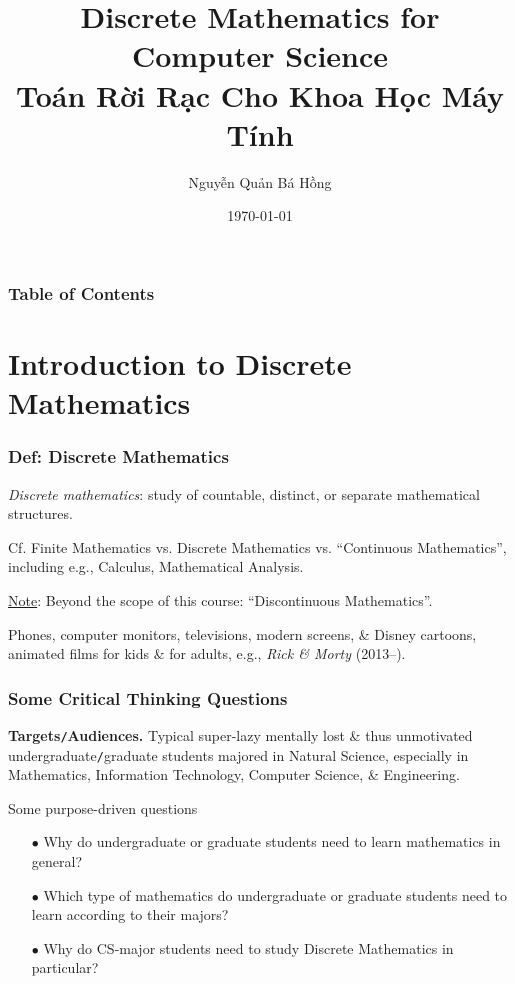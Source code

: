 \documentclass{beamer}
\title{Discrete Mathematics for Computer Science\\Toán Rời Rạc Cho Khoa Học Máy Tính}
\author{\sc Nguyễn Quản Bá Hồng}
\institute{Present at UMT -- University of Management \& Technology of HCMC}
\date{\today}
\begin{document}
\frame{\titlepage}
\begin{frame}
	\frametitle{Table of Contents}
	\tableofcontents
\end{frame}

\section{Introduction to Discrete Mathematics}

\begin{frame}
	\frametitle{Def: Discrete Mathematics}
	
	\begin{definition}
		\emph{Discrete mathematics}: study of countable, distinct, or separate mathematical structures.
	\end{definition}
	Cf. Finite Mathematics vs. Discrete Mathematics vs. ``Continuous Mathematics'', including e.g., Calculus, Mathematical Analysis.
	\vspace{2mm}
	
	\underline{Note}: Beyond the scope of this course: ``Discontinuous Mathematics''.
	
	\begin{example}[Pixel]
		Phones, computer monitors, televisions, modern screens, \& Disney cartoons, animated films for kids \& for adults, e.g., {\it Rick \& Morty} (2013--).
	\end{example}
\end{frame}

\begin{frame}
	\frametitle{Some Critical Thinking Questions}
	{\bf Targets{\tt/}Audiences.} Typical super-lazy mentally lost \& thus unmotivated undergraduate{\tt/}graduate students majored in Natural Science, especially in Mathematics, Information Technology, Computer Science, \& Engineering.
	\begin{block}{Some purpose-driven questions}
		\begin{itemize}\it
			\item[$\bullet$] Why do undergraduate or graduate students need to learn mathematics in general?
			\item[$\bullet$] Which type of mathematics do undergraduate or graduate students need to learn according to their majors?
			\item[$\bullet$] Why do CS-major students need to study Discrete Mathematics in particular?
		\end{itemize}
	\end{block}
\end{frame}
\end{document}
